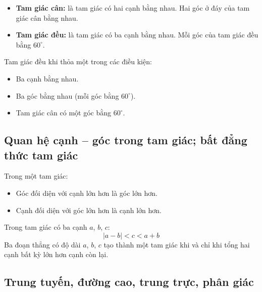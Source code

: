 \documentclass[12pt,a4paper]{article}
\begin{document}
\begin{dinhnghia}
\begin{itemize}
  \item \textbf{Tam giác cân:} là tam giác có hai cạnh bằng nhau. Hai góc ở đáy của tam giác cân bằng nhau.
  \item \textbf{Tam giác đều:} là tam giác có ba cạnh bằng nhau. Mỗi góc của tam giác đều bằng $60^\circ$.
\end{itemize}
\end{dinhnghia}

\begin{tinhchat}[title={Dấu hiệu nhận biết tam giác đều}]
Tam giác đều khi thỏa một trong các điều kiện:
\begin{itemize}
  \item Ba cạnh bằng nhau.
  \item Ba góc bằng nhau (mỗi góc bằng $60^\circ$).
  \item Tam giác cân có một góc bằng $60^\circ$.
\end{itemize}
\end{tinhchat}

\subsection{Quan hệ cạnh -- góc trong tam giác; bất đẳng thức tam giác}

\begin{tinhchat}[title={Quan hệ giữa cạnh và góc}]
Trong một tam giác:
\begin{itemize}
  \item Góc đối diện với cạnh lớn hơn là góc lớn hơn.
  \item Cạnh đối diện với góc lớn hơn là cạnh lớn hơn.
\end{itemize}
\end{tinhchat}

\begin{dinhly}[title={Bất đẳng thức tam giác}]
Trong tam giác có ba cạnh $a$, $b$, $c$:
\[
  |a - b| < c < a + b
\]
Ba đoạn thẳng có độ dài $a$, $b$, $c$ tạo thành một tam giác khi và chỉ khi tổng hai cạnh bất kỳ lớn hơn cạnh còn lại.
\end{dinhly}

\subsection{Trung tuyến, đường cao, trung trực, phân giác}
\end{document}
